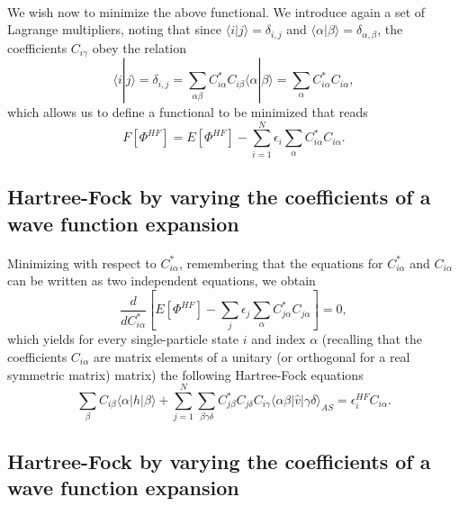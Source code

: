 \documentclass[%
twoside,                 %
final,                   %
10pt]{article}
\begin{document}
\paragraph{}
We wish now to minimize the above functional. We introduce again a set of Lagrange multipliers, noting that
since $\langle i | j \rangle = \delta_{i,j}$ and $\langle \alpha | \beta \rangle = \delta_{\alpha,\beta}$, 
the coefficients $C_{i\gamma}$ obey the relation
\[
 \langle i | j \rangle=\delta_{i,j}=\sum_{\alpha\beta} C^*_{i\alpha}C_{i\beta}\langle \alpha | \beta \rangle=
\sum_{\alpha} C^*_{i\alpha}C_{i\alpha},
\]
which allows us to define a functional to be minimized that reads
\begin{equation}
  F[\Phi^{HF}]=E[\Phi^{HF}] - \sum_{i=1}^N\epsilon_i\sum_{\alpha} C^*_{i\alpha}C_{i\alpha}.
\end{equation}





\subsection*{Hartree-Fock by varying the coefficients of a wave function expansion}

\paragraph{}
Minimizing with respect to $C^*_{i\alpha}$, remembering that the equations for $C^*_{i\alpha}$ and $C_{i\alpha}$
can be written as two  independent equations, we obtain
\[
\frac{d}{dC^*_{i\alpha}}\left[  E[\Phi^{HF}] - \sum_{j}\epsilon_j\sum_{\alpha} C^*_{j\alpha}C_{j\alpha}\right]=0,
\]
which yields for every single-particle state $i$ and index $\alpha$ (recalling that the coefficients $C_{i\alpha}$ are matrix elements of a unitary (or orthogonal for a real symmetric matrix) matrix)
the following Hartree-Fock equations
\[
\sum_{\beta} C_{i\beta}\langle \alpha | h | \beta \rangle+
\sum_{j=1}^N\sum_{\beta\gamma\delta} C^*_{j\beta}C_{j\delta}C_{i\gamma}\langle \alpha\beta|\hat{v}|\gamma\delta\rangle_{AS}=\epsilon_i^{HF}C_{i\alpha}.
\]



\subsection*{Hartree-Fock by varying the coefficients of a wave function expansion}
\end{document}
